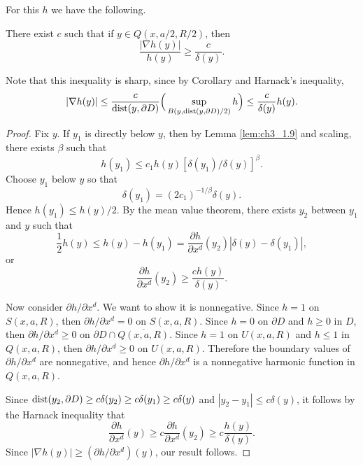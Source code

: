 For this $h$ we have the following.

\begin{lemma}\label{lem:ch3_1.10}
There exist $c$ such that if $y \in Q(x,a/2,R/2)$, then
\[
    \frac{|\nabla h(y)|}{h(y)} \geq \frac{c}{\delta(y)}.
\]
\end{lemma}

Note that this inequality is sharp, since by Corollary  and Harnack's inequality,
\[
    |\nabla h(y)| \leq \frac{c}{\operatorname{dist}(y,\partial D)}\Big(\sup_{B(y,\operatorname{dist}(y,\partial D)/2)} h\Big) \leq \frac{c}{\delta(y)}h(y).
\]

\begin{proof}
Fix $y$. If $y_1$ is directly below $y$, then by Lemma \ref{lem:ch3_1.9} and scaling, there exists $\beta$ such that
\[
    h(y_1) \leq c_1h(y)[\delta(y_1)/\delta(y)]^\beta.
\]
Choose $y_1$ below $y$ so that
\[
    \delta(y_1) = (2c_1)^{-1/\beta}\delta(y).
\]
Hence $h(y_1) \leq h(y)/2$. By the mean value theorem, there exists $y_2$ between $y_1$ and $y$ such that
\[
    \frac{1}{2}h(y) \leq h(y) - h(y_1) = \frac{\partial h}{\partial x^d}(y_2)|\delta(y) - \delta(y_1)|,
\]
or
\[
    \frac{\partial h}{\partial x^d}(y_2) \geq \frac{ch(y)}{\delta(y)}.
\]

Now consider $\partial h/\partial x^d$. We want to show it is nonnegative. Since $h = 1$ on $S(x,a,R)$, then $\partial h/\partial x^d = 0$ on $S(x,a,R)$. Since $h = 0$ on $\partial D$ and $h \geq 0$ in $D$, then $\partial h/\partial x^d \geq 0$ on $\partial D \cap \overline{Q(x,a,R)}$. Since $h = 1$ on $U(x,a,R)$ and $h \leq 1$ in $Q(x,a,R)$, then $\partial h/\partial x^d \geq 0$ on $U(x,a,R)$. Therefore the boundary values of $\partial h/\partial x^d$ are nonnegative, and hence $\partial h/\partial x^d$ is a nonnegative harmonic function in $Q(x,a,R)$.

Since $\operatorname{dist}(y_2,\partial D) \geq c\delta(y_2) \geq c\delta(y_1) \geq c\delta(y)$ and $|y_2 - y_1| \leq c\delta(y)$, it follows by the Harnack inequality that
\[
    \frac{\partial h}{\partial x^d}(y) \geq c\frac{\partial h}{\partial x^d}(y_2) \geq c\frac{h(y)}{\delta(y)}.
\]
Since $|\nabla h(y)| \geq (\partial h/\partial x^d)(y)$, our result follows.
\end{proof}


